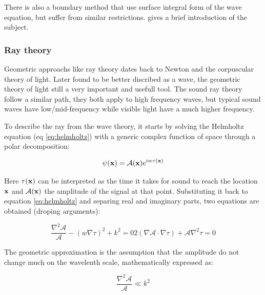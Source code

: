 There is also a boundary method that use surface integral form of the wave
equation, but suffer from similar restrictions. \citet{funkhouser2003survey}
gives a brief introduction of the subject.

\subsubsection{Ray theory}
\label{sss:raytheory}

Geometric approachs like ray theory dates back to Newton and the corpuscular
theory of light. Later found to be better discribed as a wave, the geometric
theory of light still a very important and usefull tool. The sound ray theory
follow a similar path, they both apply to high frequency waves, but typical
sound waves have low/mid-frequency while visible light have a much higher
frequency.

To describe the ray from the wave theory, it starts by solving the Helmholtz
equation (eq \ref{eq:helmholtz}) with a generic complex function of space
through a polar decomposition\cite{buckingham1992ocean,torres2007modeling}:

\begin{equation}
\label{eq:psi}
\psi(\mathrm{\mathbf{x}}) = \mathcal{A}(\mathrm{\mathbf{x}})e^{iw\tau(\mathrm{\mathbf{x}})}
\end{equation}


Here $\tau(\mathrm{\mathbf{x}})$ can be interpreted as the time it takes for sound to
reach the location $\mathrm{\mathbf{x}}$ and $\mathcal{A}(\mathrm{\mathbf{x}})$ the amplitude of the
signal at that point. Substituting it back to equation \ref{eq:helmholtz} and
separing real and imaginary parts, two equations are obtained (droping
arguments):

\begin{subequations}
\begin{equation}
\label{eq:preeikonal}
\frac{\nabla^2\mathcal{A}}{\mathcal{A}} - (w\nabla \tau)^2 + k^2 = 0
\end{equation}

\begin{equation}
\label{eq:preeikonalamp}
2(\nabla\mathcal{A} \cdot \nabla \tau) + \mathcal{A}\nabla^2 \tau = 0
\end{equation}
\end{subequations}

The geometric approximation is the assumption that the amplitude do not change
much on the wavelenth scale, mathematically expressed as:

\begin{equation}
\label{eq:highfrequency}
\frac{\nabla^2\mathcal{A}}{\mathcal{A}} \ll k^2
\end{equation}

